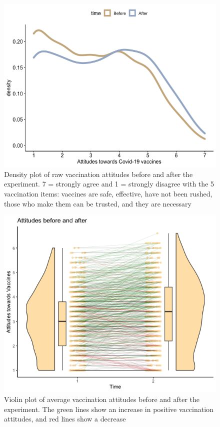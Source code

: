 \documentclass[
  english,
  ,jou,floatsintext]{apa6}
\begin{document}
\begin{figure}

{\centering \includegraphics[width=1\linewidth]{../plots/raw_density} 

}

\caption{Density plot of raw vaccination attitudes before and after the experiment. 7 = strongly agree and 1 = strongly disagree with the 5 vaccination items: vaccines are safe, effective, have not been rushed, those who make them can be trusted, and they are necessary}\label{fig:rawdensity}
\end{figure}

\begin{figure}

{\centering \includegraphics[width=1\linewidth]{../plots/before_and_after_violin} 

}

\caption{Violin plot of average vaccination attitudes before and after the experiment. The green lines show an increase in positive vaccination attitudes, and red lines show a decrease}\label{fig:beforeafter}
\end{figure}
\end{document}
